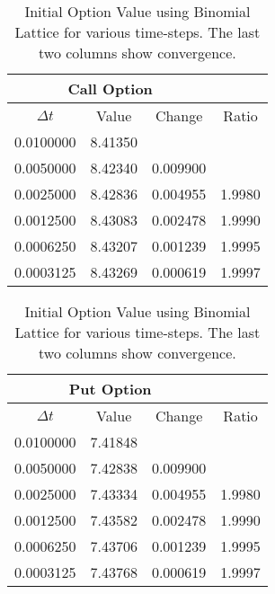\documentclass[10pt,english]{article}
\theoremstyle{plain}
\newcommand{\dt}{\Delta t}
\begin{document}
\begin{enumerate}
\begin{enumerate}
\begin{table}[t]
\centering
\begin{tabular}{|c|c|c|c|}
\multicolumn{3}{c}{Call Option}\\
\hline
	$\dt$ & Value & Change & Ratio \\
\hline
   0.0100000 &  8.41350  &          &                  \\
   0.0050000 &  8.42340  & 0.009900 &                  \\
   0.0025000 &  8.42836  & 0.004955 &  1.9980\\
   0.0012500 &  8.43083  & 0.002478 &  1.9990\\
   0.0006250 &  8.43207  & 0.001239 &  1.9995\\
   0.0003125 &  8.43269  & 0.000619 &  1.9997\\
\hline
\end{tabular}
\begin{tabular}{|c|c|c|c|}
\multicolumn{3}{c}{Put Option}\\
\hline
	$\dt$ & Value & Change & Ratio \\
\hline
   0.0100000 &   7.41848 &           &                  \\
   0.0050000 &   7.42838 &  0.009900 &                  \\
   0.0025000 &   7.43334 &  0.004955 &  1.9980\\
   0.0012500 &   7.43582 &  0.002478 &  1.9990\\
   0.0006250 &   7.43706 &  0.001239 &  1.9995\\
   0.0003125 &   7.43768 &  0.000619 &  1.9997\\
\hline
\end{tabular}
\caption{Initial Option Value using Binomial Lattice for various time-steps. The last two columns show convergence.}
\end{table}

\end{enumerate}
\end{enumerate}
\end{document}
